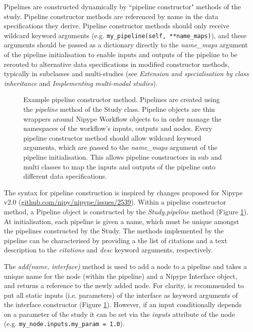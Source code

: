 \documentclass[smallextended]{svjour3}       %
\begin{document}
Pipelines are constructed dynamically by ``pipeline constructor" methods
of the study. Pipeline constructor methods are referenced by name in the
data specifications they derive. Pipeline constructor methods should only
receive wildcard keyword arguments (e.g. \lstinline{my_pipeline(self, **name_maps)}),
and these arguments should be passed as a dictionary directly to the \emph{name\_maps} argument
of the pipeline initialisation to enable inputs and outputs of the
pipeline to be rerouted to alternative data specifications in modified constructor
methods, typically in subclasses and multi-studies (see
\emph{Extension and specialisation by class inheritance} and \emph{Implementing multi-modal studies}).

\begin{figure}

\caption{Example pipeline constructor method. Pipelines are
created using the \emph{pipeline} method of the Study class.
Pipeline objects are thin wrappers around Nipype Workflow objects to
in order manage the namespaces of the workflow's inputs, outputs and nodes. Every
pipeline constructor method should allow wildcard keyword arguments,
which are passed to the \emph{name\_maps} argument of the pipeline
initialisation. This allows pipeline constructors in sub and multi classes to map the
inputs and outputs of the pipeline onto different data specifications.}
\label{fig:pipeline_constructor}
\end{figure}

The syntax for pipeline construction is inspired by changes proposed for Nipype v2.0
(\url{github.com/nipy/nipype/issues/2539}).
Within a pipeline constructor method, a Pipeline object is constructed by the \emph{Study.pipeline} method
(Figure \ref{fig:pipeline_constructor}). At initialisation, each pipeline is given a name,
which must be unique amongst the pipelines constructed by the Study. The methods implemented
by the pipeline can be characterised by providing a the list of citations
and a text description to the \emph{citations} and \emph{desc} keyword arguments, respectively.

The \emph{add(name, interface)} method is used to add a node to a pipeline and takes
a unique name for the node (within the pipeline) and a Nipype Interface object, and returns
a reference to the newly added node. For clarity, is recommended to put all static inputs
(i.e. parameters) of the interface as keyword arguments of the interface constructor
(Figure \ref{fig:pipeline_constructor}). However, if an input conditionally depends on a parameter of the
study it can be set via the \emph{inputs} attribute of the node (e.g. \lstinline{my_node.inputs.my_param = 1.0}).
\end{document}
